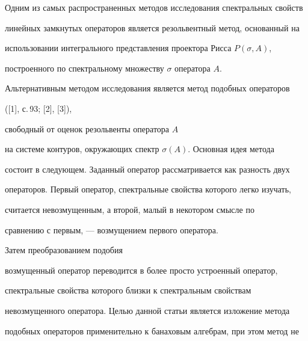 \date{}




\pagestyle{plain} %







\maketitle


\label{begin}














Одним из самых распространенных методов исследования спектральных свойств


линейных замкнутых операторов является резольвентный метод, основанный на


использовании интегрального представления проектора Рисса $P(\sigma,A)$,


построенного по спектральному множеству $\sigma$ оператора $A$.


Альтернативным методом исследования является метод подобных операторов


([1], с.\,93; [2], [3]),


свободный от оценок резольвенты оператора $A$


на системе контуров, окружающих спектр $\sigma(A)$. Основная идея метода


состоит в следующем. Заданный оператор рассматривается как разность двух


операторов. Первый оператор, спектральные свойства которого легко изучать,


считается невозмущенным, а второй, малый в некотором смысле по


сравнению с первым, --- возмущением первого оператора.


Затем преобразованием подобия


возмущенный оператор переводится в более просто устроенный оператор,


спектральные свойства которого близки к спектральным свойствам


невозмущенного оператора. Целью данной статьи является  изложение метода


подобных операторов применительно к банаховым алгебрам, при этом метод не


